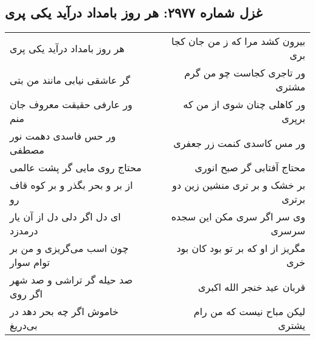 \begin{center}
\section*{غزل شماره ۲۹۷۷: هر روز بامداد درآید یکی پری}
\label{sec:2977}
\begin{longtable}{l p{0.5cm} r}
هر روز بامداد درآید یکی پری
&&
بیرون کشد مرا که ز من جان کجا بری
\\
گر عاشقی نیابی مانند من بتی
&&
ور تاجری کجاست چو من گرم مشتری
\\
ور عارفی حقیقت معروف جان منم
&&
ور کاهلی چنان شوی از من که برپری
\\
ور حس فاسدی دهمت نور مصطفی
&&
ور مس کاسدی کنمت زر جعفری
\\
محتاج روی مایی گر پشت عالمی
&&
محتاج آفتابی گر صبح انوری
\\
از بر و بحر بگذر و بر کوه قاف رو
&&
بر خشک و بر تری منشین زین دو برتری
\\
ای دل اگر دلی دل از آن یار درمدزد
&&
وی سر اگر سری مکن این سجده سرسری
\\
چون اسب می‌گریزی و من بر توام سوار
&&
مگریز از او که بر تو بود کان بود خری
\\
صد حیله گر تراشی و صد شهر اگر روی
&&
قربان عید خنجر الله اکبری
\\
خاموش اگر چه بحر دهد در بی‌دریغ
&&
لیکن مباح نیست که من رام یشتری
\\
\end{longtable}
\end{center}
